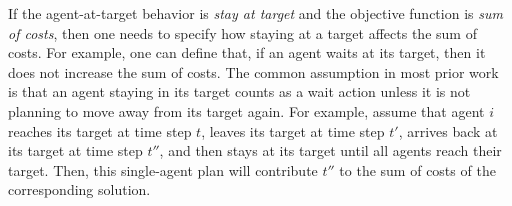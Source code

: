 \documentclass[letterpaper]{article} %
\newcommand{\comment}[1]{{\nb{\textbf{Comment:}}{orange}{#1}}}
\begin{document}

If the agent-at-target behavior is \emph{stay at target} and the objective function is \emph{sum of costs}, then one needs to specify how  staying at a target affects the sum of costs. For example, one can define that, if an agent waits at its target, then it does not increase the sum of costs. The common assumption in most prior work is that an agent staying in its target counts as a wait action unless it is not planning to move away from its target again. For example, assume that agent $i$ reaches its target at time step $t$, leaves its target at time step $t'$, arrives back at its target at time step $t''$, 
and then stays at its target until all agents reach their target. 
Then, this single-agent plan will contribute $t''$ to the sum of costs of the corresponding solution. 
\end{document}

